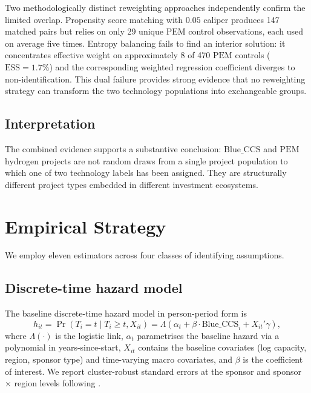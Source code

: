 \documentclass[11pt,a4paper]{article}
\newcommand{\BlueCCS}{\mathrm{Blue\_CCS}}
\newcommand{\PEM}{\mathrm{PEM}}
\begin{document}
Two methodologically distinct reweighting approaches independently confirm the limited overlap. Propensity score matching \citep{RosenbaumRubin1983, Caliendo2008} with $0.05$ caliper produces 147 matched pairs but relies on only 29 unique $\PEM$ control observations, each used on average five times. Entropy balancing \citep{Hainmueller2012} fails to find an interior solution: it concentrates effective weight on approximately 8 of 470 $\PEM$ controls ($\mathrm{ESS} = 1.7\%$) and the corresponding weighted regression coefficient diverges to non-identification. This dual failure provides strong evidence that no reweighting strategy can transform the two technology populations into exchangeable groups.

\subsection{Interpretation}

The combined evidence supports a substantive conclusion: $\BlueCCS$ and $\PEM$ hydrogen projects are not random draws from a single project population to which one of two technology labels has been assigned. They are structurally different project types embedded in different investment ecosystems.

\section{Empirical Strategy}

We employ eleven estimators across four classes of identifying assumptions.

\subsection{Discrete-time hazard model}

The baseline discrete-time hazard model in person-period form \citep{Allison2014, SingerWillett2003} is
\begin{equation}
  h_{it} = \Pr(T_i = t \mid T_i \geq t, X_{it}) = \Lambda\!\left(\alpha_t + \beta \cdot \BlueCCS_i + X_{it}'\gamma\right),
  \label{eq:dt_hazard}
\end{equation}
where $\Lambda(\cdot)$ is the logistic link, $\alpha_t$ parametrises the baseline hazard via a polynomial in years-since-start, $X_{it}$ contains the baseline covariates (log capacity, region, sponsor type) and time-varying macro covariates, and $\beta$ is the coefficient of interest. We report cluster-robust standard errors at the sponsor and sponsor $\times$ region levels following \citet{Wooldridge2010}.
\end{document}
